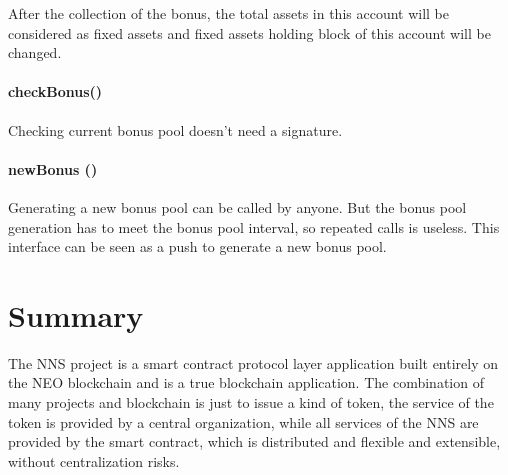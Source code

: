 \documentclass[letterpaper,10pt,english]{sphinxmanual}
\begin{document}
After the collection of the bonus, the total assets in this account will be considered as fixed assets and fixed assets holding block
of this account will be changed.


\subsubsection{checkBonus()}
\label{\detokenize{nns_protocol:checkbonus}}
Checking current bonus pool doesn’t need a signature.

 

%
\begin{sphinxVerbatim}[commandchars=\\\{\}]
      
         
          
         
\end{sphinxVerbatim}


\subsubsection{newBonus ()}
\label{\detokenize{nns_protocol:newbonus}}
Generating a new bonus pool can be called by anyone. But the bonus pool generation has to meet the bonus pool interval, so repeated calls is useless.
This interface can be seen as a push to generate a new bonus pool.


\chapter{Summary}
\label{\detokenize{nns_summary:summary}}\label{\detokenize{nns_summary::doc}}
The NNS project is a smart contract protocol layer application built entirely on the NEO blockchain and is a true blockchain application.
The combination of many projects and blockchain is just to issue a kind of token, the service of the token is provided by a central organization,
while all services of the NNS are provided by the smart contract, which is distributed and flexible and extensible, without centralization risks.
\end{document}
